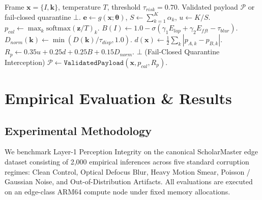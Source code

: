 \documentclass[conference]{IEEEtran}
\begin{document}
\begin{algorithm}[t]
\caption{Layer-1 Perception Integrity Gating \& Calibration}
\label{alg:perception_gate}
\begin{algorithmic}[1]
\REQUIRE Frame $\mathbf{x} = \{I, \mathbf{k}\}$, temperature $T$, threshold $\tau_{risk} = 0.70$.
\ENSURE Validated payload $\mathcal{P}$ or fail-closed quarantine $\bot$.
\STATE $\mathbf{e} \leftarrow g(\mathbf{x}; \boldsymbol{\theta})$, $S \leftarrow \sum_{k=1}^K \alpha_k$, $u \leftarrow K/S$.
\STATE $p_{cal} \leftarrow \max_k \mathrm{softmax}(\mathbf{z} / T)_k$.
\STATE $B(I) \leftarrow 1.0 - \sigma(\gamma_1 E_{lap} + \gamma_2 E_{fft} - \tau_{blur})$.
\STATE $D_{norm}(\mathbf{k}) \leftarrow \min(D(\mathbf{k})/\tau_{disp}, 1.0)$.
\STATE $d(\mathbf{x}) \leftarrow \frac{1}{2}\sum_k |p_{A,k} - p_{B,k}|$.
\STATE $R_p \leftarrow 0.35 u + 0.25 d + 0.25 B + 0.15 D_{norm}$.
    \RETURN $\bot$ (Fail-Closed Quarantine Interception)
\ELSE
    \RETURN $\mathcal{P} \leftarrow \mathtt{ValidatedPayload}(\mathbf{x}, p_{cal}, R_p)$.
\ENDIF
\end{algorithmic}
\end{algorithm}

\section{Empirical Evaluation \& Results}
\subsection{Experimental Methodology}
We benchmark Layer-1 Perception Integrity on the canonical ScholarMaster edge dataset consisting of 2,000 empirical inferences across five standard corruption regimes: Clean Control, Optical Defocus Blur, Heavy Motion Smear, Poisson / Gaussian Noise, and Out-of-Distribution Artifacts. All evaluations are executed on an edge-class ARM64 compute node under fixed memory allocations.
\end{document}
